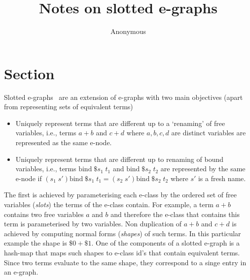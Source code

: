 \documentclass[acmsmall,screen, nonacm, anonymous]{acmart}
\begin{document}
\title{Notes on slotted e-graphs}

\author{Anonymous}






\maketitle

\section*{Section}

Slotted e-graphs~\cite{slotted-egraphs} are an extension of e-graphs with two main objectives (apart from representing sets of equivalent terms)
\begin{itemize}
  \item Uniquely represent terms that are different up to a `renaming' of free variables, i.e., terms $a + b$ and $c + d$ where $a,b,c,d$ are distinct variables are represented as the same e-node.
  \item Uniquely represent terms that are different up to renaming of bound variables, i.e., terms $\text{bind}\;\$s_1\; t_1$ and $\text{bind}\; \$s_2\;t_2$ are represented by the same e-node if $(s_1 \; s') \text{bind}\; \$s_1\;t_1 = (s_2 \; s') \text{bind}\;\$s_2\;t_2$ where $s'$ is a fresh name.
\end{itemize}

The first is achieved by parameterising each e-class by the ordered set of free variables (\textit{slots}) the terms of the e-class contain.
For example, a term $a + b$ contains two free variables $a$ and $b$ and therefore the e-class that contains this term is parameterised by two variables.
Non duplication of $a + b$ and $c + d$ is achieved by computing normal forms (\textit{shapes}) of such terms.
In this particular example the shape is $\$0 + \$1$.
One of the components of a slotted e-graph is a hash-map that maps such shapes to e-class id's that contain equivalent terms.
Since two terms evaluate to the same shape, they correspond to a singe entry in an e-graph.
\end{document}
